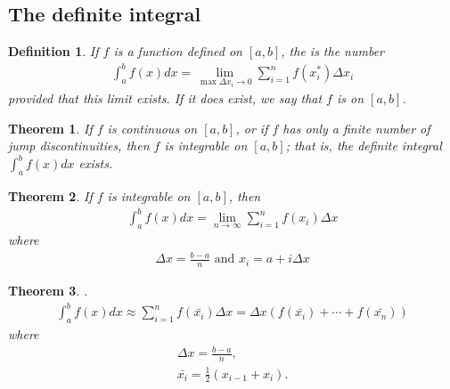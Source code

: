 \documentclass{article}
\theoremstyle{sltheorem}
\newtheorem{definition}{Definition}[section]
\newtheorem{theorem}{Theorem}[section]
\begin{document}
\subsection{The definite integral}
\begin{definition}
    If $f$ is a function defined on $[a,b]$, the  is the number
    \begin{align*}
        \int_a^b f(x)dx=\lim_{\max \Delta x_i\to0}\sum_{i=1}^n f(x_i^*)\Delta x_i
    \end{align*}
    provided that this limit exists. If it does exist, we say that $f$ is  on $[a,b]$.
\end{definition}
\begin{theorem}
    If $f$ is continuous on $[a,b]$, or if $f$ has only a finite number of jump discontinuities, then $f$ is integrable on $[a,b]$; that is, the definite integral $\int_a^b f(x)dx$ exists.
\end{theorem}
\begin{theorem}
    If $f$ is integrable on $[a,b]$, then \begin{align*}
        \int_a^b f(x)dx = \lim_{n\to\infty}\sum_{i=1}^nf(x_i)\Delta x
    \end{align*}
    where \begin{align*}
    \Delta x = \frac{b-a}{n} \text{ and } x_i=a+i\Delta x
    \end{align*}
\end{theorem}
\begin{theorem}
    .
    \begin{align*}
        \int_a^bf(x)dx \approx \sum_{i=1}^nf(\bar{x_i})\Delta x = \Delta x (f(\bar{x_i})+\cdots+f(\bar{x_n}))
    \end{align*}
    where
    \begin{align*}
        \Delta x = \frac{b-a}{n},\\
        \bar{x_i} = \frac{1}{2}(x_{i-1}+x_i).
    \end{align*}
\end{theorem}
\end{document}
